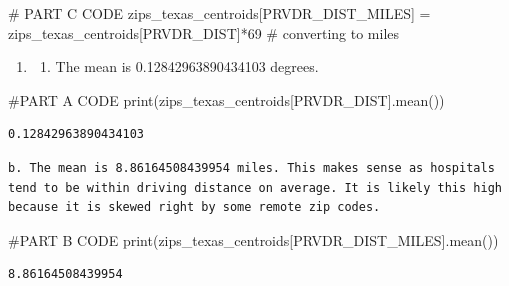 \documentclass[
  letterpaper,
  DIV=11,
  numbers=noendperiod]{scrartcl}
\newenvironment{Shaded}{\begin{snugshade}}{\end{snugshade}}
\newcommand{\BuiltInTok}[1]{\textcolor[rgb]{0.00,0.23,0.31}{#1}}
\newcommand{\CommentTok}[1]{\textcolor[rgb]{0.37,0.37,0.37}{#1}}
\newcommand{\DecValTok}[1]{\textcolor[rgb]{0.68,0.00,0.00}{#1}}
\newcommand{\NormalTok}[1]{\textcolor[rgb]{0.00,0.23,0.31}{#1}}
\newcommand{\OperatorTok}[1]{\textcolor[rgb]{0.37,0.37,0.37}{#1}}
\newcommand{\StringTok}[1]{\textcolor[rgb]{0.13,0.47,0.30}{#1}}
\providecommand{\tightlist}{%
  \setlength{\itemsep}{0pt}\setlength{\parskip}{0pt}}\usepackage{longtable,booktabs,array}
\begin{document}
\begin{Shaded}
\begin{Highlighting}[]
\CommentTok{\# PART C CODE}
\NormalTok{zips\_texas\_centroids[}\StringTok{\textquotesingle{}PRVDR\_DIST\_MILES\textquotesingle{}}\NormalTok{] }\OperatorTok{=}\NormalTok{ zips\_texas\_centroids[}\StringTok{\textquotesingle{}PRVDR\_DIST\textquotesingle{}}\NormalTok{]}\OperatorTok{*}\DecValTok{69} \CommentTok{\# converting to miles}
\end{Highlighting}
\end{Shaded}

\begin{enumerate}
\def\labelenumi{\arabic{enumi}.}
\setcounter{enumi}{4}
\tightlist
\item
  \begin{enumerate}
  \def\labelenumii{\alph{enumii}.}
  \tightlist
  \item
    The mean is 0.12842963890434103 degrees.
  \end{enumerate}
\end{enumerate}

\begin{Shaded}
\begin{Highlighting}[]
\CommentTok{\#PART A CODE}
\BuiltInTok{print}\NormalTok{(zips\_texas\_centroids[}\StringTok{\textquotesingle{}PRVDR\_DIST\textquotesingle{}}\NormalTok{].mean())}
\end{Highlighting}
\end{Shaded}

\begin{verbatim}
0.12842963890434103
\end{verbatim}

\begin{verbatim}
b. The mean is 8.86164508439954 miles. This makes sense as hospitals tend to be within driving distance on average. It is likely this high because it is skewed right by some remote zip codes.
\end{verbatim}

\begin{Shaded}
\begin{Highlighting}[]
\CommentTok{\#PART B CODE}
\BuiltInTok{print}\NormalTok{(zips\_texas\_centroids[}\StringTok{\textquotesingle{}PRVDR\_DIST\_MILES\textquotesingle{}}\NormalTok{].mean())}
\end{Highlighting}
\end{Shaded}

\begin{verbatim}
8.86164508439954
\end{verbatim}
\end{document}
